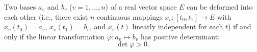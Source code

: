 Two bases $a_v$ and $b_v$ ($v = 1, \ldots, n$) of a real vector space $E$ can be deformed into each other (i.e., there exist $n$ continuous mappings $x_v: [t_0, t_1] \to E$ with $x_v(t_0) = a_v$, $x_v(t_1) = b_v$, and $x_v(t)$ linearly independent for each $t$) if and only if the linear transformation $\varphi: a_v \mapsto b_v$ has positive determinant:
$$\det \varphi > 0.$$
